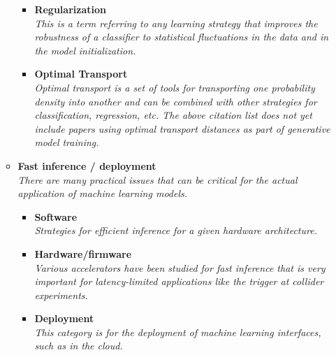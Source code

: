 \documentclass[12pt,letterpaper]{article}
\begin{document}
\begin{itemize}
\begin{itemize}
\begin{itemize}
				\item \textbf{Regularization}~\cite{Araz:2021wqm,Sforza:2013hua}
				\\\textit{This is a term referring to any learning strategy that improves the robustness of a classifier to statistical fluctuations in the data and in the model initialization.}
				\item \textbf{Optimal Transport}~\cite{Komiske:2019fks,Cai:2020vzx,Romao:2020ojy,Pollard:2021fqv,Cai:2021hnn,Manole:2022bmi,Gouskos:2022xvn}
				\\\textit{Optimal transport is a set of tools for transporting one probability density into another and can be combined with other strategies for classification, regression, etc.  The above citation list does not yet include papers using optimal transport distances as part of generative model training.}
			\end{itemize}
		\item \textbf{Fast inference / deployment}
		\\\textit{There are many practical issues that can be critical for the actual application of machine learning models.}
			\begin{itemize}
				\item \textbf{Software}~\cite{Strong:2020mge,Gligorov:2012qt,Weitekamp:DLPS2017,Nguyen:2018ugw,Bourgeois:2018nvk,1792136,Balazs:2021uhg,Rehm:2021zow,Mahesh:2021iph,Amrouche:2021tio,Pol:2021iqw,Goncharov:2021wvd,Saito:2021vpp}
				\\\textit{Strategies for efficient inference for a given hardware architecture.}
				\item \textbf{Hardware/firmware}~\cite{Duarte:2018ite,DiGuglielmo:2020eqx,Summers:2020xiy,1808088,Iiyama:2020wap,Mohan:2020vvi,Carrazza:2020qwu,Rankin:2020usv,Heintz:2020soy,Rossi:2020sbh,Aarrestad:2021zos,Hawks:2021ruw,Teixeira:2021yhl,Hong:2021snb,DiGuglielmo:2021ide,Migliorini:2021fuj,Govorkova:2021utb,Elabd:2021lgo,Jwa:2019zlh,Butter:2022lkf,Khoda:2022dwz,Carlson:2022vac}
				\\\textit{Various accelerators have been studied for fast inference that is very important for latency-limited applications like the trigger at collider experiments.}
				\item \textbf{Deployment}~\cite{Kuznetsov:2020mcj,SunnebornGudnadottir:2021nhk}
				\\\textit{This category is for the deployment of machine learning interfaces, such as in the cloud.}
			\end{itemize}
	\end{itemize}

\end{itemize}
\end{document}
